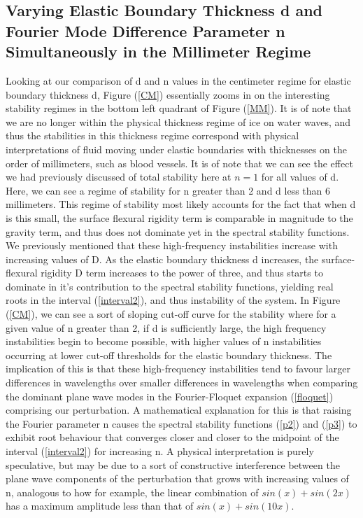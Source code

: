 \documentclass{article}
\begin{document}
\subsection{Varying Elastic Boundary Thickness d and Fourier Mode Difference Parameter n Simultaneously in the Millimeter Regime}

Looking at our comparison of d and n values in the centimeter regime for elastic boundary thickness d, Figure (\ref{CM}) essentially zooms in on the interesting stability regimes in the bottom left quadrant of Figure (\ref{MM}). It is of note that we are no longer within the physical thickness regime of ice on water waves, and thus the stabilities in this thickness regime correspond with physical interpretations of fluid moving under elastic boundaries with thicknesses on the order of millimeters, such as blood vessels. It is of note that we can see the effect we had previously discussed of total stability here at \(n = 1\) for all values of d. 
\\

Here, we can see a regime of stability for n greater than 2 and d less than 6 millimeters. This regime of stability most likely accounts for the fact that when d is this small, the surface flexural rigidity term is comparable in magnitude to the gravity term, and thus does not dominate yet in the spectral stability functions. We previously mentioned that these high-frequency instabilities increase with increasing values of D. As the elastic boundary thickness d increases, the surface-flexural rigidity D term increases to the power of three, and thus starts to dominate in it's contribution to the spectral stability functions, yielding real roots in the interval (\ref{interval2}), and thus instability of the system. In Figure (\ref{CM}), we can see a sort of sloping cut-off curve for the stability where for a given value of n greater than 2, if d is sufficiently large, the high frequency instabilities begin to become possible, with higher values of n instabilities occurring at lower cut-off thresholds for the elastic boundary thickness. The implication of this is that these high-frequency instabilities tend to favour larger differences in wavelengths over smaller differences in wavelengths when comparing the dominant plane wave modes in the Fourier-Floquet expansion (\ref{floquet}) comprising our perturbation. A mathematical explanation for this is that raising the Fourier parameter n causes the spectral stability functions (\ref{p2}) and (\ref{p3}) to exhibit root behaviour that converges closer and closer to the midpoint of the interval (\ref{interval2}) for increasing n. A physical interpretation is purely speculative, but may be due to a sort of constructive interference between the plane wave components of the perturbation that grows with increasing values of n, analogous to how for example, the linear combination of \(sin(x) + sin(2x)\) has a maximum amplitude less than that of \(sin(x) + sin(10x)\). 
\\
\\
\end{document}
